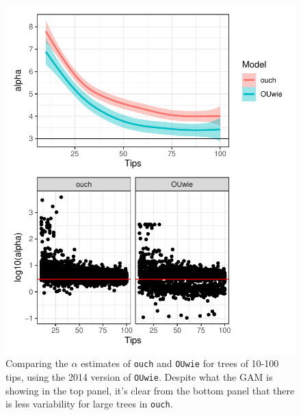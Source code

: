 \documentclass[12pt,reqno,final]{amsart}\usepackage[]{graphicx}\usepackage[]{color}
\makeatletter
\def\maxwidth{ %
  \ifdim\Gin@nat@width>\linewidth
    \linewidth
  \else
    \Gin@nat@width
  \fi
}
\newenvironment{kframe}{%
 \def\at@end@of@kframe{}%
 \ifinner\ifhmode%
  \def\at@end@of@kframe{\end{minipage}}%
  \begin{minipage}{\columnwidth}%
 \fi\fi%
 \def\FrameCommand##1{\hskip\@totalleftmargin \hskip-\fboxsep
 \colorbox{shadecolor}{##1}\hskip-\fboxsep
     \hskip-\linewidth \hskip-\@totalleftmargin \hskip\columnwidth}%
 \MakeFramed {\advance\hsize-\width
   \@totalleftmargin\z@ \linewidth\hsize
   \@setminipage}}%
 {\par\unskip\endMakeFramed%
 \at@end@of@kframe}
\newenvironment{knitrout}{}{} %
\theoremstyle{plain}
\numberwithin{equation}{part}
\makeatother
\begin{document}
\begin{knitrout}
\color{fgcolor}\begin{kframe}


{\ttfamily\noindent\itshape{}}\end{kframe}\begin{figure}
\includegraphics[width=\maxwidth]{figure/unnamed-chunk-4-1} \caption{Comparing the $\alpha$ estimates of \texttt{ouch} and \texttt{OUwie} for trees of 10-100 tips, using the 2014 version of \texttt{OUwie}. Despite what the GAM is showing in the top panel, it's clear from the bottom panel that there is less variability for large trees in \texttt{ouch}.}\label{fig:unnamed-chunk-4}
\end{figure}


\end{knitrout}
\end{document}
